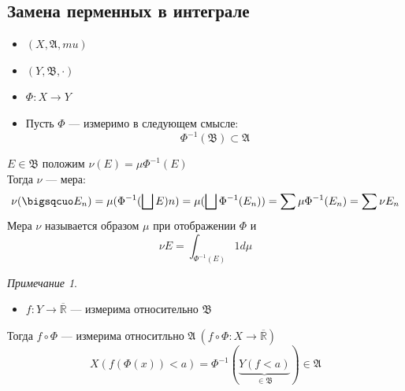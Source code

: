 \documentclass[oneside]{book}
\newcommand{\R}{\mathbb{R}}
\newcommand{\A}{\mathfrak{A}}
\newcommand{\B}{\mathfrak{B}}
\theoremstyle{plain}
\theoremstyle{remark}
\newtheorem*{remark}{Примечание}
\theoremstyle{definition}
\begin{document}
\subsection{Замена перменных в интеграле}
\label{sec:orgf80d410}
\begin{itemize}
\item \((X, \A, mu)\)
\item \((Y, \B, \cdot)\)
\item \(\Phi: X \to Y\)
\end{itemize}


\begin{itemize}
\item Пусть \(\Phi\) --- измеримо в следующем смысле:
\[ \Phi^{-1}(\B) \subset \A \]
\end{itemize}

 \(E \in \B\) положим \(\nu(E) = \mu \Phi^{-1}(E)\) \\
Тогда \(\nu\) --- мера:
\[ \nu(\bigsqcuo E_n) = \mu(\Phi^{-1}(\bigsqcup E)n) = \mu(\bigsqcup\Phi^{-1}(E_n)) = \sum \mu \Phi^{-1} (E_n) = \sum \nu E_n\]
Мера \(\nu\) называется образом \(\mu\) при отображении \(\Phi\) и
\[ \nu E = \int_{\Phi^{-1}(E)} 1 d\mu \]
\begin{remark}
\-
\begin{itemize}
\item \(f: Y \to \overline{\R}\) --- измерима относительно \(\B\)
\end{itemize}
Тогда \(f\circ \Phi\) --- измерима относитльно \(\A\ (f\circ \Phi: X\to\overline{\R})\)
\[ X(f(\Phi(x)) < a) = \Phi^{-1}(\underbrace{Y(f < a)}_{\in \B}) \in \A \]
\end{remark}
\end{document}
